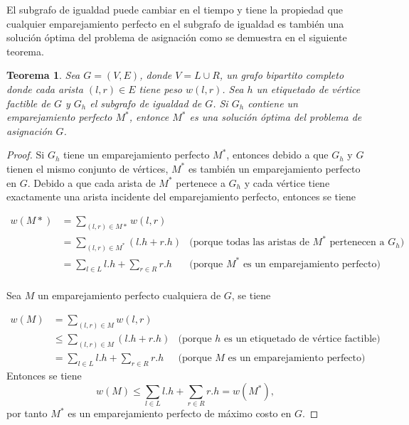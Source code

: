 \documentclass[10pt]{article} %
\newtheorem{thm}{Teorema}
\begin{document}
	El subgrafo de igualdad puede cambiar en el tiempo y tiene la propiedad que cualquier emparejamiento perfecto en el subgrafo de igualdad es tambi\'en una soluci\'on \'optima del problema de asignaci\'on como se demuestra en el siguiente teorema.
	\begin{thm} \cite{introduction}
		\label{thm: emparejamiento}
		Sea $G=(V,E)$, donde $V = L \cup R$, un grafo bipartito completo donde cada arista $(l,r) \in E$ tiene peso $w(l,r)$. Sea $h$ un etiquetado de v\'ertice factible de $G$ y $G_h$ el subgrafo de igualdad de $G$. Si $G_h$ contiene un emparejamiento perfecto $M^*$, entonce $M^*$ es una soluci\'on \'optima del problema de asignaci\'on $G$. 
		
	\end{thm}

	\begin{proof}
		Si $G_h$ tiene un emparejamiento perfecto $M^*$, entonces debido a que $G_h$ y $G$ tienen el mismo conjunto de v\'ertices, $M^*$ es tambi\'en un emparejamiento perfecto en $G$. Debido a que cada arista de $M^*$ pertenece a $G_h$ y cada v\'ertice tiene exactamente una arista incidente del emparejamiento perfecto, entonces se tiene
		
		\begin{align}
			w(M*) &= \sum_{(l,r) \in M*} w(l,r)\\
			&= \sum_{(l,r) \in M^*}(l.h + r.h) &\text{(porque todas las aristas de $M^*$ pertenecen a $G_h$)}\\
			&= \sum_{l \in L}l.h + \sum_{r \in R} r.h &\text{(porque $M^{*}$ es un emparejamiento perfecto)}\\
		\end{align} 
		
		Sea $M$ un emparejamiento perfecto cualquiera de $G$, se tiene
		
		\begin{align}
			w(M) &= \sum_{(l,r) \in M} w(l,r)\\
			&\leq \sum_{(l,r) \in M} (l.h + r.h) &\text{(porque $h$ es un etiquetado de v\'ertice factible)}\\
			&= \sum_{l \in L} l.h + \sum_{r \in R} r.h &\text{(porque $M$ es un emparejamiento perfecto)}
		\end{align}
		Entonces se tiene
		\begin{equation}
			w(M) \leq \sum_{l \in L} l.h + \sum_{r \in R} r.h = w(M^*),
		\end{equation}
		por tanto $M^*$ es un emparejamiento perfecto de m\'aximo costo en $G$.
	\end{proof}
\end{document}
